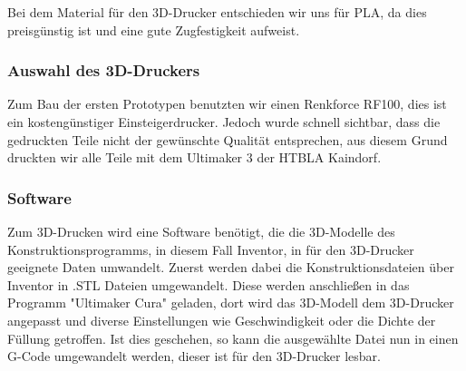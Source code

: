 Bei dem Material für den 3D-Drucker entschieden wir uns für PLA, da dies preisgünstig ist und eine gute Zugfestigkeit aufweist.

\subsubsection{Auswahl des 3D-Druckers}
Zum Bau der ersten Prototypen benutzten wir einen Renkforce RF100, dies ist ein kostengünstiger Einsteigerdrucker.
Jedoch wurde schnell sichtbar, dass die gedruckten Teile nicht der gewünschte Qualität entsprechen, aus diesem Grund
druckten wir alle Teile mit dem Ultimaker 3 der HTBLA Kaindorf.

\subsubsection{Software}
Zum 3D-Drucken wird eine Software benötigt, die die 3D-Modelle des Konstruktionsprogramms, in diesem Fall Inventor,
in für den 3D-Drucker geeignete Daten umwandelt.
Zuerst werden dabei die Konstruktionsdateien über Inventor in .STL Dateien umgewandelt. Diese werden anschließen in das
Programm "Ultimaker Cura" geladen, dort wird das 3D-Modell dem 3D-Drucker angepasst und diverse Einstellungen wie
Geschwindigkeit oder die Dichte der Füllung getroffen. Ist dies geschehen, so kann die ausgewählte Datei nun in einen
G-Code umgewandelt werden, dieser ist für den 3D-Drucker lesbar.

